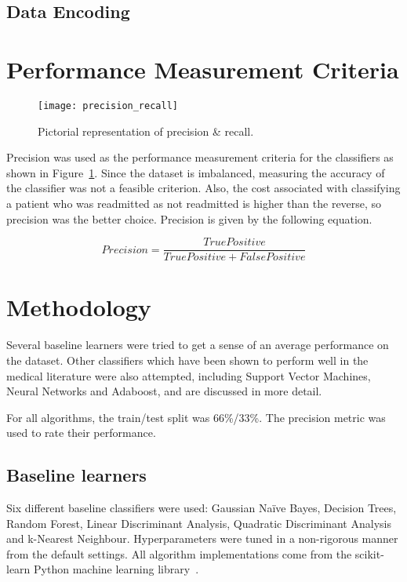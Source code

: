 \documentclass[conference]{IEEEtran}
\begin{document}
\subsection{Data Encoding}



\section{Performance Measurement Criteria}

\begin{figure}[htpb]
	\centering
	\texttt{[image: precision\_recall]}
	\caption{Pictorial representation of precision \& recall.}
	\label{fig:precision_recall}
\end{figure}

Precision was used as the performance measurement criteria for the classifiers as shown in Figure~\ref{fig:precision_recall}. Since the dataset is imbalanced, measuring the accuracy of the classifier was not a feasible criterion. Also, the cost associated with classifying a patient who was readmitted as not readmitted is higher than the reverse, so precision was the better choice. Precision is given by the following equation.

\[ Precision = \frac{True Positive}{True Positive + False Positive} \]

\section{Methodology}

Several baseline learners were tried to get a sense of an average performance on the dataset. Other classifiers which have been shown to perform well in the medical literature were also attempted, including Support Vector Machines, Neural Networks and Adaboost, and are discussed in more detail.

For all algorithms, the train/test split was 66\%/33\%. The precision metric was used to rate their performance.

\subsection{Baseline learners}

Six different baseline classifiers were used: Gaussian Naïve Bayes, Decision Trees, Random Forest, Linear Discriminant Analysis, Quadratic Discriminant Analysis and k-Nearest Neighbour. Hyperparameters were tuned in a non-rigorous manner from the default settings. All algorithm implementations come from the scikit-learn Python machine learning library~\cite{scikit-learn}.
\end{document}

